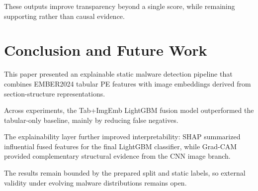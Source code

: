 \documentclass[conference]{IEEEtran}
\begin{document}
These outputs improve transparency beyond a single score, while remaining supporting rather than causal evidence.

% 

\section{Conclusion and Future Work}
\label{section:conclusion-and-futurework}

This paper presented an explainable static malware detection pipeline that combines EMBER2024 tabular PE features with image embeddings derived from section-structure representations.

Across experiments, the Tab+ImgEmb LightGBM fusion model outperformed the tabular-only baseline, mainly by reducing false negatives.

The explainability layer further improved interpretability: SHAP summarized influential fused features for the final LightGBM classifier, while Grad-CAM provided complementary structural evidence from the CNN image branch.

The results remain bounded by the prepared split and static labels, so external validity under evolving malware distributions remains open.

\end{document}
